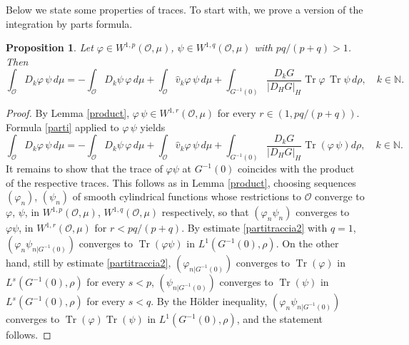 \documentclass[reqno,twoside,12pt]{amsart}
\newtheorem{Proposition}[Theorem]{Proposition}
\begin{document}
Below we state some properties of traces. 
To start with, we prove  a version of the integration by parts formula. 

\begin{Proposition}
\label{Prop:particlassica}
Let  $\varphi\in W^{1,p}({\mathcal O}, \mu)$, $\psi\in W^{1,q}({\mathcal O}, \mu)$ with $pq/(p+q)>1$. Then
\begin{equation}
\label{particlassica}
\int_{\mathcal O} D_k\varphi \,\psi \,d\mu = -\int_{\mathcal O} D_k\psi \,\varphi \,d\mu +  \int_{\mathcal O} \hat{v}_k\varphi \,\psi\, d\mu + \int_{G^{-1}(0)} \frac{D_k G}{|D_HG|_H }{\operatorname{Tr}} \varphi \,{\operatorname{Tr}} \psi \,d\rho , \quad k\in {\mathbb N} .
\end{equation}
\end{Proposition}
\begin{proof} 
By Lemma \ref{product}, $\varphi\,\psi\in W^{1,r}({\mathcal O}, \mu)$ for every $r\in (1, pq/(p+q))$. Formula  \eqref{parti} applied to $\varphi\,\psi$ yields
$$\int_{\mathcal O} D_k\varphi \,\psi \,d\mu = -\int_{\mathcal O} D_k\psi \,\varphi \,d\mu +  \int_{\mathcal O} \hat{v}_k\varphi \,\psi\, d\mu + \int_{G^{-1}(0)} \frac{D_k G}{|D_HG|_H }{\operatorname{Tr}}( \varphi \, \psi) d\rho , \quad k\in {\mathbb N} .$$
It remains to show that the trace of $ \varphi  \psi$ at $G^{-1}(0)$ coincides with the product of the respective traces. 
This follows as in Lemma \ref{product}, choosing sequences  $(\varphi_n)$, $(\psi_n)$  of smooth cylindrical functions whose restrictions to ${\mathcal O}$ converge to $\varphi$, $\psi$, in $ W^{1,p}({\mathcal O}, \mu)$, $W^{1,q}({\mathcal O}, \mu)$ respectively, so that $(\varphi_n \psi_n)$  converges to $\varphi \psi$, in $ W^{1,r}({\mathcal O}, \mu)$ for $r<pq/(p+q)$. 
By estimate \eqref{partitraccia2} with $q=1$, $(\varphi_n\psi_{n|G^{-1}(0)})$ converges to ${\operatorname{Tr}}( \varphi  \psi) $ in $L^1(G^{-1}(0), \rho)$. On the other hand, still by estimate \eqref{partitraccia2}, 
$(\varphi_{n|G^{-1}(0)})$ converges to ${\operatorname{Tr}}( \varphi ) $ in $L^s(G^{-1}(0), \rho)$ for every $s< p$, 
$(\psi_{n|G^{-1}(0)})$ converges to ${\operatorname{Tr}}( \psi ) $ in $L^s(G^{-1}(0), \rho)$ for every $s< q$. By the H\"older inequality, 
$(\varphi_n\psi_{n|G^{-1}(0)})$ converges to ${\operatorname{Tr}}( \varphi ) {\operatorname{Tr}}( \psi ) $ in $L^1(G^{-1}(0), \rho)$, and the statement follows. 
\end{proof}
\end{document}
